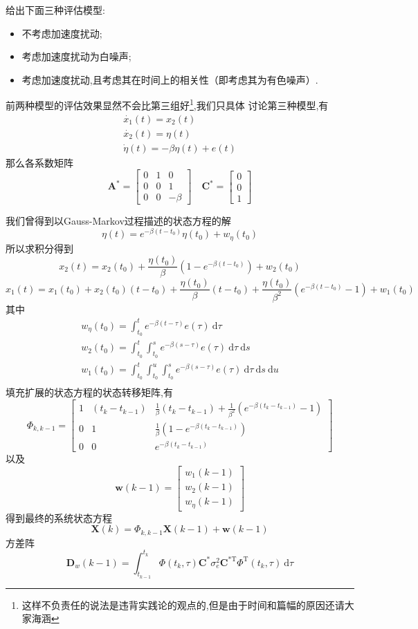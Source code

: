 \documentclass[cn,10pt,citestyle=gb7714-2015,bibstyle=gb7714-2015]{elegantbook}
\newcommand{\md}{\ \mathrm{d}}
\newcommand{\mT}{\mathrm{T}}
\begin{document}
\begin{solution}
  给出下面三种评估模型:
  \begin{itemize}
    \item 不考虑加速度扰动;
    \item 考虑加速度扰动为白噪声;
    \item 考虑加速度扰动,且考虑其在时间上的相关性（即考虑其为有色噪声）.
  \end{itemize}
  前两种模型的评估效果显然不会比第三组好\footnote{这样不负责任的说法是违背实践论的观点的,但是由于时间和篇幅的原因还请大家海涵},我们只具体
  讨论第三种模型,有
  \begin{gather}
    \dot{x_1}(t)=x_2(t)\\
    \dot{x_2}(t)=\eta(t)\\
    \dot{\eta}(t)=-\beta\eta(t)+e(t)
  \end{gather}
  那么各系数矩阵
  \[
    \bm{A}^*=\begin{bmatrix}
      0&1&0\\
      0&0&1\\
      0&0&-\beta
    \end{bmatrix}\quad\bm{C}^*=\begin{bmatrix}
      0\\
      0\\
      1
    \end{bmatrix}
  \]

  我们曾得到以Gauss-Markov过程描述的状态方程的解
  \[
    \boxed{\eta(t)=e^{-\beta(t-t_0)}\eta(t_0)+w_\eta(t_0)}
  \]
  所以求积分得到
  \[
    x_2(t)=x_2(t_0)+\frac{\eta(t_0)}{\beta}\left(1-e^{-\beta(t-t_0)}\right)+w_2(t_0)
  \]
  \[
    x_1(t)=x_1(t_0)+x_2(t_0)(t-t_0)+\frac{\eta(t_0)}{\beta}(t-t_0)+\frac{\eta(t_0)}{\beta^2}\left(e^{-\beta(t-t_0)}-1\right)+w_1(t_0)
  \]
  其中
  \begin{gather*}
    w_\eta(t_0)=\int_{t_0}^te^{-\beta(t-\tau)}e(\tau)\md\tau\\
    w_2(t_0)=\int_{t_0}^t\int_{t_0}^se^{-\beta(s-\tau)}e(\tau)\md\tau\md s\\
    w_1(t_0)=\int_{t_0}^t\int_{t_0}^u\int_{t_0}^se^{-\beta(s-\tau)}e(\tau)\md\tau\md s\md u\\
  \end{gather*}
  填充扩展的状态方程的状态转移矩阵,有
\[
  \displaystyle\bm{\varPhi}_{k,k-1}=\left[\begin{matrix}
    1&(t_k-t_{k-1})&\frac{1}{\beta}(t_k-t_{k-1})+\frac{1}{\beta^2}(e^{-\beta(t_k-t_{k-1})}-1)\\
    0&1&\frac{1}{\beta}(1-e^{-\beta(t_k-t_{k-1})})\\
    0&0&e^{-\beta(t_k-t_{k-1})}
  \end{matrix}\right]
\]
以及
\[
  \bm{w}(k-1)=\begin{bmatrix}
    w_1(k-1)\\
    w_2(k-1)\\
    w_\eta(k-1)
  \end{bmatrix}
\]
得到最终的系统状态方程
\[
  \bm{X}(k)=\bm{\varPhi}_{k,k-1}\bm{X}(k-1)+\bm{w}(k-1)
\]
方差阵
\[
  \bm{D}_w(k-1)=\int_{t_{k-1}}^{t_k}\bm{\varPhi}(t_k,\tau)\bm{C}^*\sigma_e^2\bm{C}^{*\mT}\bm{\varPhi}^\mT(t_k,\tau)\md\tau
\]
\end{solution}
\end{document}
